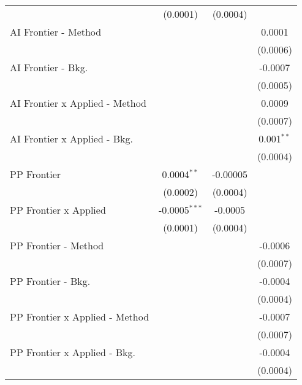 \begin{tabular}{lccc}
                                  & (0.0001)        & (0.0004)        &   \\   
   AI Frontier - Method           &                 &                 & 0.0001\\   
                                  &                 &                 & (0.0006)\\   
   AI Frontier - Bkg.             &                 &                 & -0.0007\\   
                                  &                 &                 & (0.0005)\\   
   AI Frontier x Applied - Method &                 &                 & 0.0009\\   
                                  &                 &                 & (0.0007)\\   
   AI Frontier x Applied - Bkg.   &                 &                 & 0.001$^{**}$\\   
                                  &                 &                 & (0.0004)\\   
   PP Frontier                    & 0.0004$^{**}$   & -0.00005        &   \\   
                                  & (0.0002)        & (0.0004)        &   \\   
   PP Frontier x Applied          & -0.0005$^{***}$ & -0.0005         &   \\   
                                  & (0.0001)        & (0.0004)        &   \\   
   PP Frontier - Method           &                 &                 & -0.0006\\   
                                  &                 &                 & (0.0007)\\   
   PP Frontier - Bkg.             &                 &                 & -0.0004\\   
                                  &                 &                 & (0.0004)\\   
   PP Frontier x Applied - Method &                 &                 & -0.0007\\   
                                  &                 &                 & (0.0007)\\   
   PP Frontier x Applied - Bkg.   &                 &                 & -0.0004\\   
                                  &                 &                 & (0.0004)\\   

\end{tabular}
